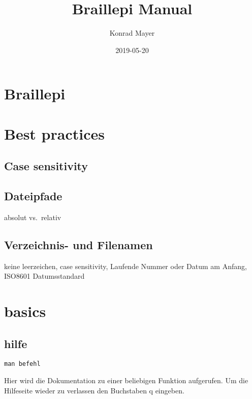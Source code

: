 \documentclass[]{book}
\title{Braillepi Manual}
\author{Konrad Mayer}
\date{2019-05-20}
\begin{document}
\maketitle

{
\setcounter{tocdepth}{1}
\tableofcontents
}
\hypertarget{braillepi}{%
\chapter{Braillepi}\label{braillepi}}

\hypertarget{best-practices}{%
\chapter{Best practices}\label{best-practices}}

\hypertarget{case-sensitivity}{%
\section{Case sensitivity}\label{case-sensitivity}}

\hypertarget{dateipfade}{%
\section{Dateipfade}\label{dateipfade}}

absolut vs.~relativ

\hypertarget{verzeichnis--und-filenamen}{%
\section{Verzeichnis- und Filenamen}\label{verzeichnis--und-filenamen}}

keine leerzeichen, case sensitivity, Laufende Nummer oder Datum am Anfang, ISO8601 Datumsstandard

\hypertarget{basics}{%
\chapter{basics}\label{basics}}

\hypertarget{hilfe}{%
\section{hilfe}\label{hilfe}}

\begin{verbatim}
man befehl
\end{verbatim}

Hier wird die Dokumentation zu einer beliebigen Funktion aufgerufen.
Um die Hilfeseite wieder zu verlassen den Buchstaben q eingeben.
\end{document}
